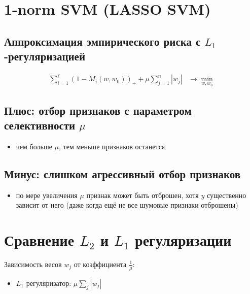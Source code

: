 \setcounter{secnumdepth}{0}

\section{1-norm SVM (LASSO SVM)}
\subsection*{Аппроксимация эмпирического риска с \(L_1\)-регуляризацией}
\begin{align*}
    \sum_{i=1}^{\ell} \left(1 - M_i(w, w_0)\right)_+ + \mu \sum_{j=1}^{n} |w_j| & \rightarrow \min_{w, w_0}
\end{align*}

\subsection*{Плюс: отбор признаков с параметром селективности \(\mu\)}
\begin{itemize}
    \item чем больше \(\mu\), тем меньше признаков останется
\end{itemize}

\subsection*{Минус: слишком агрессивный отбор признаков}
\begin{itemize}
    \item по мере увеличения \(\mu\) признак может быть отброшен, хотя $y$ существенно зависит от него (даже когда ещё не все шумовые признаки отброшены)
\end{itemize}

\newline
\newline

\section{Сравнение \(L_2\) и \(L_1\) регуляризации}

Зависимость весов \(w_j\) от коэффициента \(\frac{1}{\mu}\):

\begin{itemize}
    \item \(L_1\) регуляризатор: \(\mu \sum_{j} |w_j|\)
\end{itemize}

